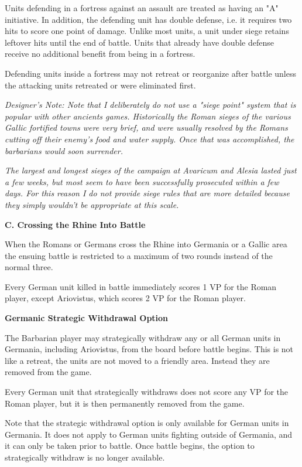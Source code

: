 Units defending in a fortress against an assault are treated as having an "A" initiative. In addition, the defending unit has double defense, i.e. it requires two hits to score one point of damage. Unlike most units, a unit under siege retains leftover hits until the end of battle. Units that already have double defense receive no additional benefit from being in a fortress.

Defending units inside a fortress may not retreat or reorganize after battle unless the attacking units retreated or were eliminated first.

\textit{Designer's Note: Note that I deliberately do not use a "siege point" system that is popular with other ancients games. Historically the Roman sieges of the various Gallic fortified towns were very brief, and were usually resolved by the Romans cutting off their enemy's food and water supply. Once that was accomplished, the barbarians would soon surrender.}

\textit{The largest and longest sieges of the campaign at Avaricum and Alesia lasted just a few weeks, but most seem to have been successfully prosecuted within a few days. For this reason I do not provide siege rules that are more detailed because they simply wouldn't be appropriate at this scale.}

\textbf{C. Crossing the Rhine Into Battle}
\par
When the Romans or Germans cross the Rhine into Germania or a Gallic area the ensuing battle is restricted to a maximum of two rounds instead of the normal three.

Every German unit killed in battle immediately scores 1 VP for the Roman player, except Ariovistus, which scores 2 VP for the Roman player.

\textbf{Germanic Strategic Withdrawal Option}
\par
The Barbarian player may strategically withdraw any or all German units in Germania, including Ariovistus, from the board before battle begins. This is not like a retreat, the units are not moved to a friendly area. Instead they are removed from the game.

Every German unit that strategically withdraws does not score any VP for the Roman player, but it is then permanently removed from the game.

Note that the strategic withdrawal option is only available for German units in Germania. It does not apply to German units fighting outside of Germania, and it can only be taken prior to battle. Once battle begins, the option to strategically withdraw is no longer available.

